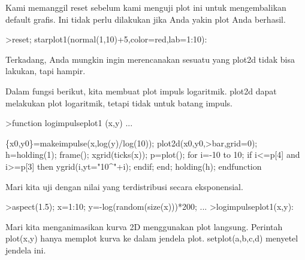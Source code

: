 \documentclass{article}
\begin{document}
\begin{eulernotebook}
\begin{eulercomment}
\begin{eulercomment}
\begin{eulercomment}
\begin{eulercomment}
\begin{eulercomment}
\begin{eulercomment}
\begin{eulercomment}
\begin{eulercomment}
\begin{eulercomment}
\begin{eulercomment}
\begin{eulercomment}
\begin{eulercomment}
\begin{eulercomment}
\begin{eulercomment}
\begin{eulercomment}
Kami memanggil reset sebelum kami menguji plot ini untuk mengembalikan
default grafis. Ini tidak perlu dilakukan jika Anda yakin plot Anda
berhasil.
\end{eulercomment}
\begin{eulerprompt}
>reset; starplot1(normal(1,10)+5,color=red,lab=1:10):
\end{eulerprompt}
\begin{eulercomment}
Terkadang, Anda mungkin ingin merencanakan sesuatu yang plot2d tidak
bisa lakukan, tapi hampir.

Dalam fungsi berikut, kita membuat plot impuls logaritmik. plot2d
dapat melakukan plot logaritmik, tetapi tidak untuk batang impuls.
\end{eulercomment}
\begin{eulerprompt}
>function logimpulseplot1 (x,y) ...
\end{eulerprompt}
\begin{eulerudf}
    \{x0,y0\}=makeimpulse(x,log(y)/log(10));
    plot2d(x0,y0,>bar,grid=0);
    h=holding(1);
    frame();
    xgrid(ticks(x));
    p=plot();
    for i=-10 to 10;
      if i<=p[4] and i>=p[3] then
         ygrid(i,yt="10^"+i);
      endif;
    end;
    holding(h);
  endfunction
\end{eulerudf}
\begin{eulercomment}
Mari kita uji dengan nilai yang terdistribusi secara eksponensial.
\end{eulercomment}
\begin{eulerprompt}
>aspect(1.5); x=1:10; y=-log(random(size(x)))*200; ...
>logimpulseplot1(x,y):
\end{eulerprompt}
\begin{eulercomment}
Mari kita menganimasikan kurva 2D menggunakan plot langsung. Perintah
plot(x,y) hanya memplot kurva ke dalam jendela plot. setplot(a,b,c,d)
menyetel jendela ini.


\end{eulercomment}
\end{eulercomment}
\end{eulercomment}
\end{eulercomment}
\end{eulercomment}
\end{eulercomment}
\end{eulercomment}
\end{eulercomment}
\end{eulercomment}
\end{eulercomment}
\end{eulercomment}
\end{eulercomment}
\end{eulercomment}
\end{eulercomment}
\end{eulercomment}
\end{eulernotebook}
\end{document}
